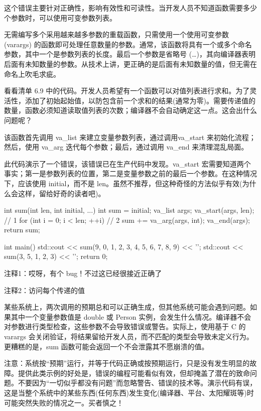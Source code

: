 这个错误主要针对正确性，影响有效性和可读性。当开发人员不知道函数需要多少个参数时，可以使用可变参数列表。


无需编写多个采用越来越多参数的重载函数，只需使用一个使用可变参数 (varargs) 的函数即可处理任意数量的参数。通常，该函数将具有一个或多个命名参数，其中一个是参数列表的长度。最后一个参数是省略号 (…)，其向编译器表明后面有未知数量的参数。从技术上讲，更正确的是后面有未知数量的值，但无需在命名上吹毛求疵。

看看清单 6.9 中的代码。开发人员希望有一个函数可以对值列表进行求和。为了灵活性，添加了初始起始值，以防包含前一个求和的结果(通常为零)。需要传递值的数量，函数必须知道读取值列表的次数；编译器不会自动确定这一点。这会出什么问题呢？

该函数首先调用 va\_list 来建立变量参数列表，通过调用va\_start 来初始化流程；然后，使用 va\_arg 迭代每个参数；最后，通过调用 va\_end 来清理混乱局面。

此代码演示了一个错误，该错误已在生产代码中发现。va\_start 宏需要知道两个事实；第一是参数列表的位置，第二是变量参数之前的最后一个参数。在这种情况下，应该使用 initial，而不是 len。虽然不推荐，但这种奇怪的方法似乎有效(为什么会这样，留给好奇的读者吧)。


\begin{cpp}
int sum(int len, int initial, ...) {
  int sum = initial;
  va_list args;
  va_start(args, len); // 1
  for (int i = 0; i < len; ++i) // 2
    sum += va_arg(args, int);
  va_end(args);
  return sum;
}

int main() {
  std::cout << sum(9, 0, 1, 2, 3, 4, 5, 6, 7, 8, 9) << '\n';
  std::cout << sum(3, 5, 1, 2, 3) << '\n';
  return 0;
}
\end{cpp}

{\footnotesize
注释1：哎呀，有个 bug！不过这已经很接近正确了

注释2：访问每个传递的值
}


某些系统上，两次调用的预期总和可以正确生成，但其他系统可能会遇到问题。如果其中一个变量参数值是 double 或 Person 实例，会发生什么情况。编译器不会对参数进行类型检查，这些参数不会导致错误或警告。实际上，使用基于 C 的 varargs 会关闭验证，将结果留给开发人员，而不匹配的类型会导致未定义行为。更糟糕的是，sum 函数可能会返回一个不会泄露其不愿崩溃的值。

注意：系统按“预期”运行，并等于代码正确或按预期运行，只是没有发生明显的故障。提供此类示例的好处是，错误的编程可能看似有效，但却掩盖了潜在的致命问题。不要因为“一切似乎都没有问题”而忽略警告、错误的技术等。演示代码有误，这是当整个系统中的某些东西(任何东西)发生变化(编译器、平台、太阳耀斑等)时可能突然失败的情况之一。买者慎之！

